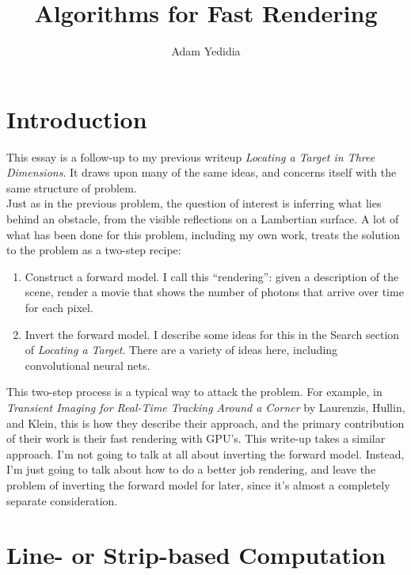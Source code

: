 \documentclass[11pt]{article}
\title{Algorithms for Fast Rendering}
\author{Adam Yedidia}
\begin{document}
\maketitle
    
\section{Introduction}

This essay is a follow-up to my previous writeup \emph{Locating a Target in Three Dimensions}. It draws upon many of the same ideas, and concerns itself with the same structure of problem. \\

Just as in the previous problem, the question of interest is inferring what lies behind an obstacle, from the visible reflections on a Lambertian surface. A lot of what has been done for this problem, including my own work, treats the solution to the problem as a two-step recipe: \\

\begin{enumerate}

\item Construct a forward model. I call this ``rendering'': given a description of the scene, render a movie that shows the number of photons that arrive over time for each pixel. 

\item Invert the forward model. I describe some ideas for this in the Search section of \emph{Locating a Target}. There are a variety of ideas here, including convolutional neural nets.

\end{enumerate}

This two-step process is a typical way to attack the problem. For example, in \emph{Transient Imaging for Real-Time Tracking Around a Corner} by Laurenzis, Hullin, and Klein, this is how they describe their approach, and the primary contribution of their work is their fast rendering with GPU's. This write-up takes a similar approach. I'm not going to talk at all about inverting the forward model. Instead, I'm just going to talk about how to do a better job rendering, and leave the problem of inverting the forward model for later, since it's almost a completely separate consideration.

\section{Line- or Strip-based Computation}
\end{document}
